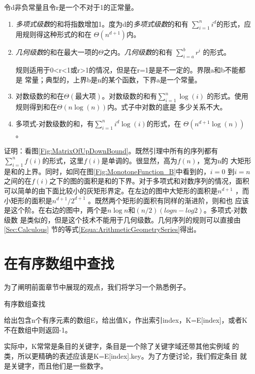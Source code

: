 \begin{theorem}\label{Theorem:1_13}
令d非负常量且令r是一个不对于1的正常量。
\begin{enumerate}
\item \emph{多项式级数}的和将指数增加1。度为d的\emph{多项式级数}的和有
        $\sum\limits_{i=1}^{n}i^d$的形式，应用规则得这种形式的和在
        $\Theta(n^{d+1})$内。
\item \emph{几何级数}的和在最大一项的$\Theta$之内。\emph{几何级数}的和有
        $\sum\limits_{i=a}^{b}r^i$ 的形式。

        规则适用于0<r<1或r>1的情况，但是在r=1是是不一定的。界限a和b不能都是
        常量；典型的，上界b是n的某个函数，下界a是一个常量。
\item 对数级数的和在$\Theta(最大项)$。对数级数的和有$\sum\limits_{i=1}^{n}\log(i)$
        的形式。使用规则得到和在$\Theta(n\log(n))$内。式子中对数的底是
        多少关系不大。
\item 多项式-对数级数的和，有$\sum\limits_{i=1}^{n}i^d\log(i)$的形式，在
        $\Theta(n^{d+1}\log(n))$ 。
\end{enumerate}

证明：看图\ref{Fig:MatrixOfUpDownBound}。既然引理中所有的序列都有
$\sum\limits_{i=1}^nf(i)$的形式，这里$f(i)$是单调的。很显然，高为$f(n)$，宽为n的
大矩形是和的上界。同时，如同在图\ref{Fig:MonotoneFunction_B}中看到的，$i=0$
到$i=n$之间的在$f(i)$之下的图的面积是和的下界。对于多项式和对数序列的情况，面积
可以简单的由下面比较小的灰矩形界定。在左边的图中大矩形的面积是$n^{d+1}$ ，而
小矩形的面积是$n^{d+1}/2^{d+1}$ 。既然两个矩形的面积有同样的渐进阶，则和也
应该是这个阶。在右边的图中，两个是$n\log n$和$(n/2)(logn-log2)$。多项式-对数级数
是类似的，但是这个技术不能用于几何级数。几何序列的规则可以直接由\ref{Sec:Calculous}
节的等式\ref{Equa:ArithmeticGeometrySeries}得出。

\end{theorem}

\section{在有序数组中查找}\label{Sec:SearchInOrderArray}
为了阐明前面章节中展现的观点，我们将学习一个熟悉例子。
\begin{problem}
有序数组查找

给出包含n个有序元素的数组E，给出值K，作出索引index，K=E[index]，或者K不在数组中则返回-1。
\end{problem}
实际中，K常常是条目的关键字，条目是一个除了关键字域还带其他实例域
的类，所以更精确的表述应该是K=E[index].key。为了方便讨论，我们假定条目
就是关键字，而且他们是一些数字。

